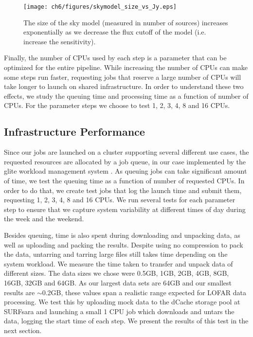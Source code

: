 \begin{figure}
    \texttt{[image: ch6/figures/skymodel\_size\_vs\_Jy.eps]}
      \caption{The size of the sky model (measured in number of sources) increases exponentially as we decrease the flux cutoff of the model (i.e. increase the sensitivity).}
	\label{fig:ch6_skymodel_size}
\end{figure}


Finally, the number of CPUs used by each step is a parameter that can be optimized for the entire pipeline. While increasing the number of CPUs can make some steps run faster, requesting jobs that reserve a large number of CPUs will take longer to launch on shared infrastructure. In order to understand these two effects, we study the queuing time and processing time as a function of number of CPUs. For the parameter steps we choose to test 1, 2, 3, 4, 8 and 16 CPUs. 

\subsection{Infrastructure Performance}

Since our jobs are launched on a cluster supporting several different use cases, the requested resources are allocated by a job queue, in our case implemented by the glite workload management system \citep{glite-wms}. As queuing jobs can take significant amount of time, we test the queuing time as a function of number of requested CPUs. In order to do that, we create test jobs that log the launch time and submit them, requesting 1, 2, 3, 4, 8 and 16 CPUs. We run several tests for each parameter step to ensure that we capture system variability at different times of day during the week and the weekend. 

Besides queuing, time is also spent during downloading and unpacking data, as well as uploading and packing the results. Despite using no compression to pack the data, untarring and tarring large files still takes time depending on the system workload. We measure the time taken to transfer and unpack data of different sizes. The data sizes we chose were 0.5GB, 1GB, 2GB, 4GB, 8GB, 16GB, 32GB and 64GB. As our largest data sets are 64GB and our smallest results are $\sim$0.2GB, these values span a realistic range expected for LOFAR data processing. We test this by uploading mock data to the dCache storage pool at SURFsara and launching a small 1 CPU job which downloads and untars the data, logging the start time of each step. We present the results of this test in the next section. 


